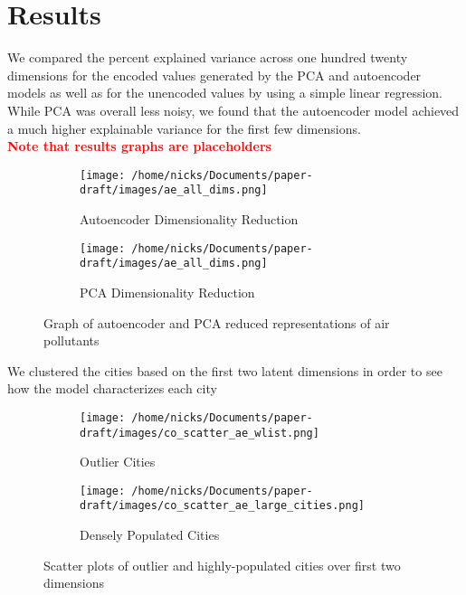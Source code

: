 \documentclass{article}
\newcommand\note[1]{\textbf{\textcolor{red}{#1}}}
\begin{document}
\section{Results}
We compared the percent explained variance across one hundred twenty dimensions for
the encoded values generated by the PCA and autoencoder models as well as for the unencoded
values by using a simple linear regression. While PCA was overall less noisy, we found that
the autoencoder model achieved a much higher explainable variance for the first few dimensions.
\\ \note{Note that results graphs are placeholders}
\begin{figure}[h!]

\begin{subfigure}{0.5\textwidth}
    \texttt{[image: /home/nicks/Documents/paper-draft/images/ae\_all\_dims.png]} 
    \caption{Autoencoder Dimensionality Reduction}
    \label{fig:ae_dim_reduction}
\end{subfigure}%
\begin{subfigure}{0.5\textwidth}
    \texttt{[image: /home/nicks/Documents/paper-draft/images/ae\_all\_dims.png]}
    \caption{PCA Dimensionality Reduction}
    \label{fig:pca_dim_reduction}
\end{subfigure}

\caption{Graph of autoencoder and PCA reduced representations of air pollutants}
\label{fig:ae_vs_pca}
\end{figure}

\par We clustered the cities based on the first two latent dimensions in order to see how
the model characterizes each city

\begin{figure}[h!]

\begin{subfigure}{0.5\textwidth}
    \texttt{[image: /home/nicks/Documents/paper-draft/images/co\_scatter\_ae\_wlist.png]} 
    \caption{Outlier Cities}
    \label{fig:outliers}
\end{subfigure}%
\begin{subfigure}{0.5\textwidth}
    \texttt{[image: /home/nicks/Documents/paper-draft/images/co\_scatter\_ae\_large\_cities.png]}
    \caption{Densely Populated Cities}
    \label{fig:dense_cities}
\end{subfigure}

\caption{Scatter plots of outlier and highly-populated cities over first two dimensions}
\label{fig:outliers_vs_dense_cities}
\end{figure}
\end{document}
